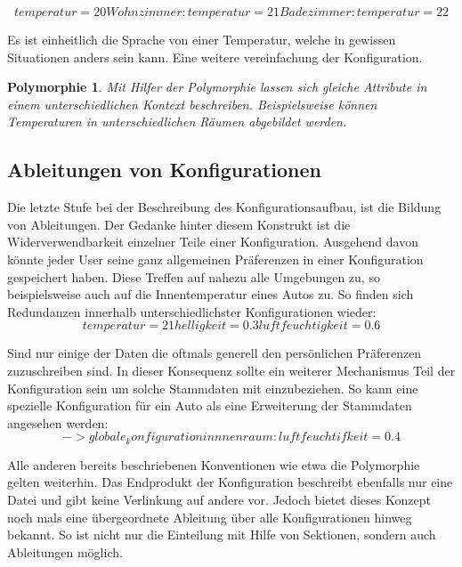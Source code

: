 \begin{equation}
  temperatur = 20
	
	Wohnzimmer: 
		temperatur = 21
	
	Badezimmer: 
		temperatur = 22

\end{equation} 

Es ist einheitlich die Sprache von einer Temperatur, welche in gewissen Situationen anders sein kann. Eine weitere vereinfachung der Konfiguration.

\newtheorem{mydef}{Polymorphie}
\begin{mydef}
Mit Hilfer der Polymorphie lassen sich gleiche Attribute in einem unterschiedlichen Kontext beschreiben. Beispielsweise können Temperaturen in unterschiedlichen Räumen abgebildet werden.
\end{mydef}

\subsection{Ableitungen von Konfigurationen}
Die letzte Stufe bei der Beschreibung des Konfigurationsaufbau, ist die Bildung von Ableitungen. Der Gedanke hinter diesem Konstrukt ist die Widerverwendbarkeit einzelner Teile einer Konfiguration. Ausgehend davon könnte jeder User seine ganz allgemeinen Präferenzen in einer Konfiguration gespeichert haben. Diese Treffen auf nahezu alle Umgebungen zu, so beispielsweise auch auf die Innentemperatur eines Autos zu. So finden sich Redundanzen innerhalb unterschiedlichster Konfigurationen wieder:
\begin{equation}
	temperatur = 21
	helligkeit = 0.3
	luftfeuchtigkeit = 0.6

\end{equation} 

Sind nur einige der Daten die oftmals generell den persönlichen Präferenzen zuzuschreiben sind. In dieser Konsequenz sollte ein weiterer Mechanismus Teil der Konfiguration sein um solche Stammdaten mit einzubeziehen. So kann eine spezielle Konfiguration für ein Auto als eine Erweiterung der Stammdaten angesehen werden:
\begin{equation}
	-> globale_konfiguration
	
	innnenraum:
		luftfeuchtifkeit = 0.4

\end{equation} 

Alle anderen bereits beschriebenen Konventionen wie etwa die Polymorphie gelten weiterhin. Das Endprodukt der Konfiguration beschreibt ebenfalls nur eine Datei und gibt keine Verlinkung auf andere vor. Jedoch bietet dieses Konzept noch mals eine übergeordnete Ableitung über alle Konfigurationen hinweg bekannt. So ist nicht nur die Einteilung mit Hilfe von Sektionen, sondern auch Ableitungen möglich. 

